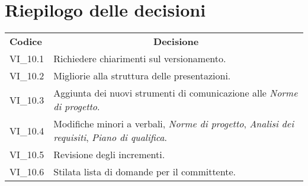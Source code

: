 % 
\section{Riepilogo delle decisioni}
\begin{longtable} {
		>{\centering}p{17mm} 
		>{}p{120mm}}
	\rowcolor{gray!50}
	\textbf{Codice} & \multicolumn{1}{c}{\textbf{Decisione}} \\
	VI\_10.1 & Richiedere chiarimenti sul versionamento. \TBstrut \\ [2mm]
	VI\_10.2 & Migliorie alla struttura delle presentazioni. \TBstrut \\ [2mm]
	VI\_10.3 & Aggiunta dei nuovi strumenti di comunicazione alle \textit{Norme di progetto}. \TBstrut \\ [2mm]
	VI\_10.4 & Modifiche minori a verbali, \textit{Norme di progetto}, \textit{Analisi dei requisiti}, \textit{Piano di qualifica}. \TBstrut \\ [2mm]
	VI\_10.5 & Revisione degli incrementi. \TBstrut \\ [2mm]
	VI\_10.6 & Stilata lista di domande per il committente. \TBstrut \\ [2mm]
\end{longtable}